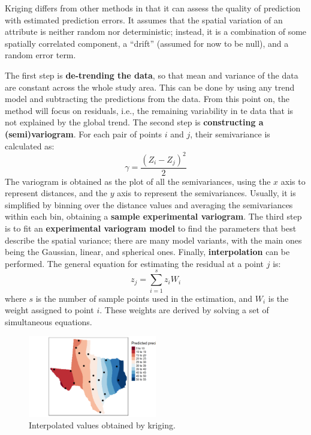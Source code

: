 Kriging differs from other methods in that it can assess the quality of prediction with estimated prediction errors. It assumes that the spatial variation of an attribute is neither random nor deterministic; instead, it is a combination of some spatially correlated component, a ``drift'' (assumed for now to be null), and a random error term.

The first step is \textbf{de-trending the data}, so that mean and variance of the data are constant across the whole study area. This can be done by using any trend model and subtracting the predictions from the data. From this point on, the method will focus on residuals, i.e., the remaining variability in te data that is not explained by the global trend. The second step is \textbf{constructing a (semi)variogram}. For each pair of points $i$ and $j$, their semivariance is calculated as:
\begin{equation*}
    \gamma = \frac{(Z_i - Z_j)^2}{2}
\end{equation*}
The variogram is obtained as the plot of all the semivariances, using the $x$ axis to represent distances, and the $y$ axis to represent the semivariances. Usually, it is simplified by binning over the distance values and averaging the semivariances within each bin, obtaining a \textbf{sample experimental variogram}. The third step is to fit an \textbf{experimental variogram model} to find the parameters that best describe the spatial variance; there are many model variants, with the main ones being the Gaussian, linear, and spherical ones. Finally, \textbf{interpolation} can be performed. The general equation for estimating the residual at a point $j$ is:
\begin{equation*}
    z_j = \sum_{i=1}^s z_i W_i
\end{equation*}
where $s$ is the number of sample points used in the estimation, and $W_i$ is the weight assigned to point $i$. These weights are derived by solving a set of simultaneous equations.
\begin{figure}[!ht]
    \centering
    \includegraphics[width=0.5\textwidth]{img/interpolation_kriging.png}
    \caption{Interpolated values obtained by kriging.}
    \label{fig:interpolation_kriging}
\end{figure}

